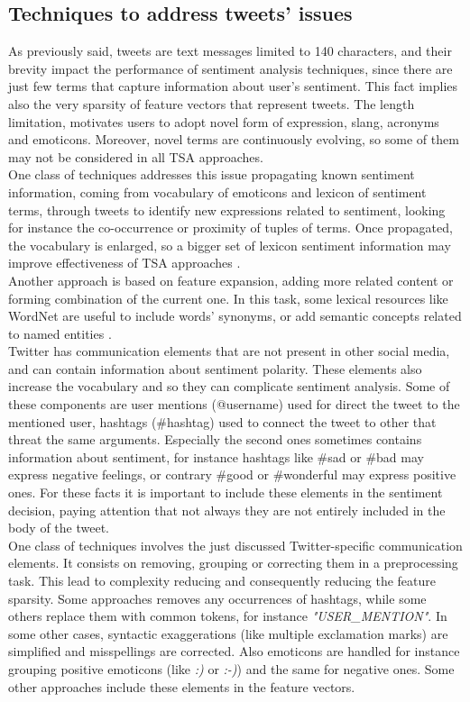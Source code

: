 \subsection{Techniques to address tweets' issues}
As previously said, tweets are text messages limited to 140 characters, and their brevity impact the performance of sentiment analysis techniques, since there are just few terms that capture information about user's sentiment. This fact implies also the very sparsity of feature vectors that represent tweets. The length limitation, motivates users to adopt novel form of expression, slang, acronyms and emoticons. Moreover, novel terms are continuously evolving, so some of them may not be considered in all TSA approaches.\\
One class of techniques addresses this issue propagating known sentiment information, coming from vocabulary of emoticons and lexicon of sentiment terms, through tweets to identify new expressions related to sentiment, looking for instance the co-occurrence or proximity of tuples of terms. Once propagated, the vocabulary is enlarged, so a bigger set of lexicon sentiment information may improve effectiveness of TSA approaches \cite{tang-etal-2014-learning}.\\
Another approach is based on feature expansion, adding more related content or forming combination of the current one. In this task, some lexical resources like WordNet are useful to include words' synonyms, or add semantic concepts related to named entities \cite{montejo-raetz-etal-2014}.\\
Twitter has communication elements that are not present in other social media, and can contain information about sentiment polarity. These elements also increase the vocabulary and so they can complicate sentiment analysis. Some of these components are user mentions (@username) used for direct the tweet to the mentioned user, hashtags (\#hashtag) used to connect the tweet to other that threat the same arguments. Especially the second ones sometimes contains information about sentiment, for instance hashtags like \#sad or \#bad may express negative feelings, or contrary \#good or \#wonderful may express positive ones. For these facts it is important to include these elements in the sentiment decision, paying attention that not always they are not entirely included in the body of the tweet.\\
One class of techniques involves the just discussed Twitter-specific communication elements. It consists on removing, grouping or correcting them in a preprocessing task. This lead to complexity reducing and consequently reducing the feature sparsity. Some approaches removes any occurrences of hashtags, while some others replace them with common tokens, for instance \textit{"USER\_MENTION"}. In some other cases, syntactic exaggerations (like multiple exclamation marks) are simplified and misspellings are corrected. Also emoticons are handled for instance grouping positive emoticons (like \textit{:)} or \textit{:-)}) and the same for negative ones. Some other approaches include these elements in the feature vectors.\\

